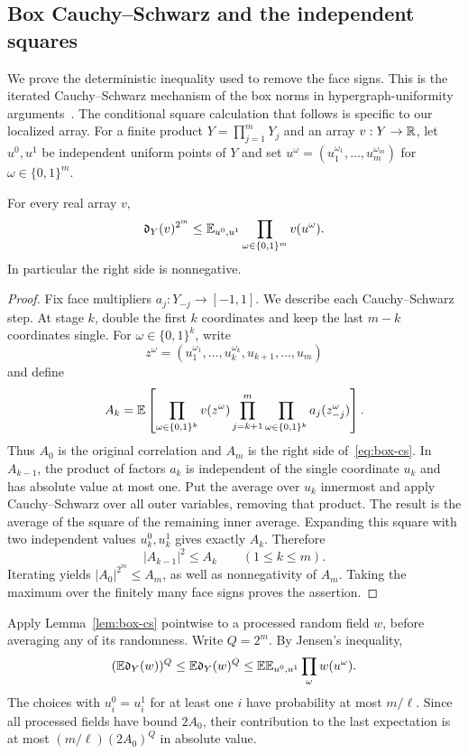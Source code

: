 \subsection{Box Cauchy--Schwarz and the independent squares}

We prove the deterministic inequality used to remove the face signs.
This is the iterated Cauchy--Schwarz mechanism of the box norms in
hypergraph-uniformity arguments~\cite[Section~3.5 and Lemma~4.1]{Gowers2007}.
The conditional square calculation that follows is specific to our
localized array.
For a finite product $Y=\prod_{j=1}^mY_j$ and an array $v:Y\to\mathbb R$,
let $u^0,u^1$ be independent uniform points of $Y$ and set
$u^\omega=(u_1^{\omega_1},\ldots,u_m^{\omega_m})$ for
$\omega\in\{0,1\}^m$.

\begin{lemma}\label{lem:box-cs}
For every real array $v$,
\begin{equation}\label{eq:box-cs}
 \mathfrak d_Y(v)^{2^m}
 \le\mathbb E_{u^0,u^1}\prod_{\omega\in\{0,1\}^m}v(u^\omega).
\end{equation}
In particular the right side is nonnegative.
\end{lemma}
\begin{proof}
Fix face multipliers $a_j:Y_{-j}\to[-1,1]$. We describe each
Cauchy--Schwarz step. At stage $k$, double the first $k$ coordinates
and keep the last $m-k$ coordinates single. For
$\omega\in\{0,1\}^k$, write
\[
 z^\omega=(u_1^{\omega_1},\ldots,u_k^{\omega_k},
                 u_{k+1},\ldots,u_m)
\]
and define
\[
 A_k=\mathbb E\left[
   \prod_{\omega\in\{0,1\}^k}v(z^\omega)
   \prod_{j=k+1}^m\prod_{\omega\in\{0,1\}^k}
                 a_j(z^\omega_{-j})\right].
\]
Thus $A_0$ is the original correlation and $A_m$ is the right side
of~\eqref{eq:box-cs}. In $A_{k-1}$, the product of factors $a_k$ is
independent of the single coordinate $u_k$ and has absolute value at
most one. Put the average over $u_k$ innermost and apply
Cauchy--Schwarz over all outer variables, removing that product.
The result is the average of the square of the remaining inner
average. Expanding this square with two independent values
$u_k^0,u_k^1$ gives exactly $A_k$. Therefore
\[
 |A_{k-1}|^2\le A_k\qquad(1\le k\le m).
\]
Iterating yields $|A_0|^{2^m}\le A_m$, as well as nonnegativity of
$A_m$. Taking the maximum over the finitely many face signs proves
the assertion.
\end{proof}

Apply Lemma~\ref{lem:box-cs} pointwise to a processed random field $w$, before
averaging any of its randomness. Write $Q=2^m$. By Jensen's inequality,
\begin{equation}\label{eq:box-outer-average}
 (\mathbb E\mathfrak d_Y(w))^Q
 \le\mathbb E\mathfrak d_Y(w)^Q
 \le\mathbb E\mathbb E_{u^0,u^1}\prod_\omega w(u^\omega).
\end{equation}
The choices with $u_i^0=u_i^1$ for at least one $i$ have probability
at most $m/\ell$. Since all processed fields have bound $2A_0$, their
contribution to the last expectation is at most
$(m/\ell)(2A_0)^Q$ in absolute value.

